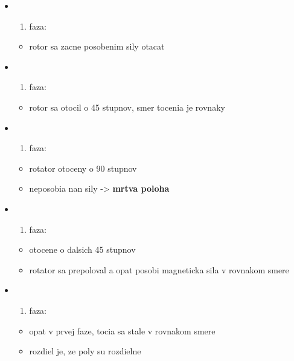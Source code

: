 \documentclass[
]{article}
\providecommand{\tightlist}{%
  \setlength{\itemsep}{0pt}\setlength{\parskip}{0pt}}
\begin{document}
\begin{itemize}
\item
  \begin{enumerate}
  \def\labelenumi{\arabic{enumi}.}
  \tightlist
  \item
    faza:
  \end{enumerate}

  \begin{itemize}
  \tightlist
  \item
    rotor sa zacne posobenim sily otacat
  \end{itemize}
\item
  \begin{enumerate}
  \def\labelenumi{\arabic{enumi}.}
  \setcounter{enumi}{1}
  \tightlist
  \item
    faza:
  \end{enumerate}

  \begin{itemize}
  \tightlist
  \item
    rotor sa otocil o 45 stupnov, smer tocenia je rovnaky
  \end{itemize}
\item
  \begin{enumerate}
  \def\labelenumi{\arabic{enumi}.}
  \setcounter{enumi}{2}
  \tightlist
  \item
    faza:
  \end{enumerate}

  \begin{itemize}
  \tightlist
  \item
    rotator otoceny o 90 stupnov
  \item
    neposobia nan sily -\textgreater{} \textbf{mrtva poloha}
  \end{itemize}
\item
  \begin{enumerate}
  \def\labelenumi{\arabic{enumi}.}
  \setcounter{enumi}{3}
  \tightlist
  \item
    faza:
  \end{enumerate}

  \begin{itemize}
  \tightlist
  \item
    otocene o dalsich 45 stupnov
  \item
    rotator sa prepoloval a opat posobi magneticka sila v rovnakom smere
  \end{itemize}
\item
  \begin{enumerate}
  \def\labelenumi{\arabic{enumi}.}
  \setcounter{enumi}{4}
  \tightlist
  \item
    faza:
  \end{enumerate}

  \begin{itemize}
  \tightlist
  \item
    opat v prvej faze, tocia sa stale v rovnakom smere
  \item
    rozdiel je, ze poly su rozdielne
  \end{itemize}
\end{itemize}
\end{document}
